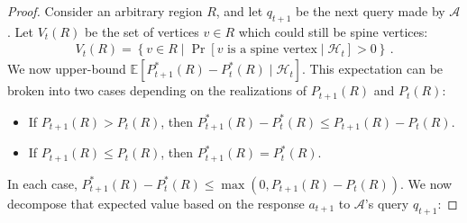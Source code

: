 \documentclass[11pt]{article}
\begin{document}
\begin{proof}
\begin{comment} By Lemma~\ref{}, we have 
\simina{Notation $F$ sounds very similar to the family of functions, use something else. actually isn't it exactly that?}
The size of $F(v)$ will be relevant. It can be upper-bounded by considering what role $v$ might play for an arbitrary spine $\vec{s}$ and index $j$:
\begin{itemize}
    \item If $v$ is the fixed point of $h^{\vec{s}, j}$, then $h^{\vec{s}, j}(v) = v$.
    \item If $v$ is on the spine $\vec{s}$ but is not the fixed point, then $h^{\vec{s}, j}(v)$ differs from $v$ in exactly one coordinate, and is either one more or one less in that coordinate. There are $2k$ ways to choose such a value.
    \item If $v$ is not on the spine $\vec{s}$, then $h^{\vec{s}, j}(v)$ differs from $v$ in exactly two coordinates: one in which $h^{\vec{s}, j}$ is one bigger, and one in which it is one smaller. There are $k(k-1)$ ways to choose such a value.
\end{itemize}
Therefore, for any vertex $v$ and $k \geq 2$:
\begin{align}
    |F(v)| &\leq 1 + 2k + k(k-1) = k^2 + k + 1 \leq k^3 \label{eq:size-F-v-less-than-k-cubed}
\end{align}
\end{comment}
Consider an arbitrary region $R$, and let $q_{t+1}$ be the next query made by $\mathcal{A}$. Let $V_t(R)$ be the set of vertices $v \in R$ which could still be spine vertices:
\begin{align}
    V_t(R) = \left\{v \in R \mid \Pr[\text{$v$ is a spine vertex} \mid \mathcal{H}_t] > 0\right\} \,.
\end{align}
We now upper-bound $\mathbb{E}[P^*_{t+1}(R) - P^*_t(R) \mid \mathcal{H}_t]$. This expectation can be broken into two cases depending on the realizations of $P_{t+1}(R)$ and $P_t(R)$:
\begin{itemize}
    \item If $P_{t+1}(R) > P_t(R)$, then $P^*_{t+1}(R) - P^*_t(R) \leq P_{t+1}(R) - P_t(R)$.
    \item If $P_{t+1}(R) \leq P_t(R)$, then $P^*_{t+1}(R) = P^*_t(R)$.
\end{itemize}
In each case, $P^*_{t+1}(R) - P^*_t(R) \leq \max (0, P_{t+1}(R) - P_t(R))$. We now decompose that expected value based on the response $a_{t+1}$ to $\mathcal{A}$'s query $q_{t+1}$:

\end{proof}
\end{document}
